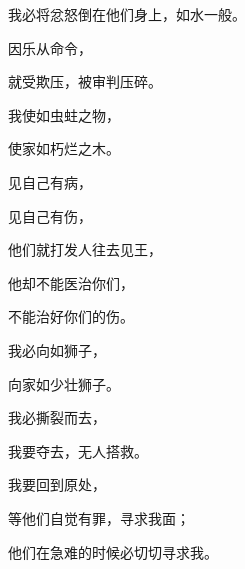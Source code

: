 {\par }{\Q 我必将忿怒倒在他们身上，如水一般。
\par }{\Q {}因乐从{}命令，
\par }{\Q 就受欺压，被审判压碎。
\par }{\Q {}我使{}如虫蛀之物，
\par }{\Q 使{}家如朽烂之木。
\par }{\BB \par }{\Q {}见自己有病，
\par }{见自己有伤，
\par }{\Q 他们就打发人往{}去见{}王，
\par }{\Q 他却不能医治你们，
\par }{\Q 不能治好你们的伤。
\par }{\Q {}我必向{}如狮子，
\par }{\Q 向{}家如少壮狮子。
\par }{\Q 我必撕裂而去，
\par }{\Q 我要夺去，无人搭救。
\par }{\BB \par }{\Q {}我要回到原处，
\par }{\Q 等他们自觉有罪，寻求我面；
\par }{\Q 他们在急难的时候必切切寻求我。

}

